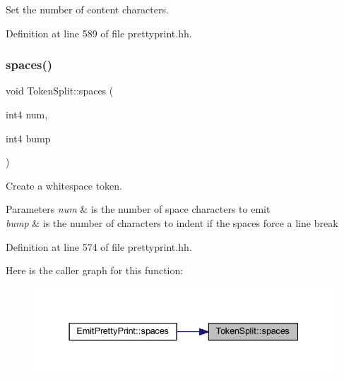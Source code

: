 Set the number of content characters. 



Definition at line 589 of file prettyprint.\+hh.

\mbox{\label{class_token_split_a2aa41522a98675a88eda3dc730e1ab1c}} 
\subsubsection{\texorpdfstring{spaces()}{spaces()}}
{\footnotesize\ttfamily void Token\+Split\+::spaces (\begin{DoxyParamCaption}\item[{int4}]{num,  }\item[{int4}]{bump }\end{DoxyParamCaption})\hspace{0.3cm}{\ttfamily [inline]}}



Create a whitespace token. 


\begin{DoxyParams}{Parameters}
{\em num} & is the number of space characters to emit \\
\hline
{\em bump} & is the number of characters to indent if the spaces force a line break \\
\hline
\end{DoxyParams}


Definition at line 574 of file prettyprint.\+hh.

Here is the caller graph for this function\+:
\nopagebreak
\begin{figure}[H]
\begin{center}
\leavevmode
\includegraphics[width=337pt]{class_token_split_a2aa41522a98675a88eda3dc730e1ab1c_icgraph}
\end{center}
\end{figure}
\mbox{\label{class_token_split_a64074d483f92a724cf846c4893b1c1c7}} 
